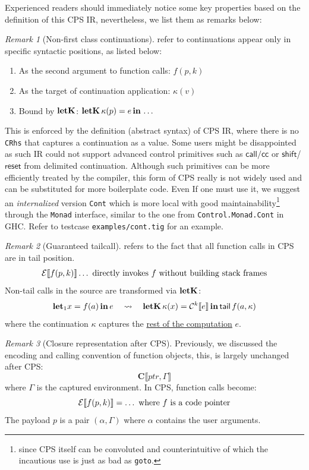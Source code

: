\documentclass[a4paper, 11pt]{article}
\theoremstyle{remark}\newtheorem*{remark}{Remark}
\theoremstyle{definition}\newtheorem*{definition}{Definition}
\begin{document}
Experienced readers should immediately notice some key properties based on the definition of
this CPS IR, nevertheless, we list them as remarks below:

\begin{remark}[Non-first class continuations] refer
to continuations appear only in specific syntactic positions, as listed below:
\begin{enumerate}
  \item As the second argument to function calls:  $f(p, k)$
  \item As the target of continuation application: $\kappa(v)$
  \item Bound by $\mathbf{letK}$: $\mathbf{letK}\, \kappa(p) = e\, \mathbf{in}\, \ldots$
\end{enumerate}
This is enforced by the definition (abstract syntax) of CPS IR, where there is
no \texttt{CRhs} that captures a continuation as a value. Some users might be disappointed
as such IR could not support advanced control primitives such as $\mathsf{call/cc}$ or
$\mathsf{shift}$/$\mathsf{reset}$ from delimited continuation. Although such primitives can be more
efficiently treated by the compiler, this form of CPS really is not widely used and can be substituted
for more boilerplate code. Even If one must use it,
we suggest an \emph{internalized} version \texttt{Cont} which is more local with
good maintainability\footnote{since CPS itself can be convoluted and counterintuitive of which
the incautious use is just as bad as \texttt{goto}.}
through the \texttt{Monad} interface, similar to the one from \texttt{Control.Monad.Cont} in GHC.
Refer to testcase \texttt{examples/cont.tig} for an example.
\end{remark}

\begin{remark}[Guaranteed tailcall] refers to the fact that all function calls in CPS are in tail position.
\[
  \mathcal{E}\llbracket f(p, k) \rrbracket\ldots\ \text{directly invokes}\ f\ \text{without building stack frames}
\]
Non-tail calls in the source are transformed via $\mathbf{letK}$:
\[
  \mathbf{let}_1 x = f(a)\, \mathbf{in}\, e
  \quad\leadsto\quad
  \mathbf{letK}\, \kappa(x) = \mathcal{C}^k\llbracket e \rrbracket\, \mathbf{in}\, \mathsf{tail}\, f(a, \kappa)
\]
where the continuation $\kappa$ captures the \underline{rest of the computation} $e$.
\end{remark}

\begin{remark}[Closure representation after CPS]
Previously, we discussed the encoding and calling convention of function objects, this, is
largely unchanged after CPS:
\[
  \mathbf{C}\llbracket \mathit{ptr}, \Gamma \rrbracket
\]
where $\Gamma$ is the captured environment.  In CPS, function calls become:
\[
  \mathcal{E}\sem{f(p, k)} = \ldots\ \text{where}\ f\ \text{is a code pointer}
\]
The payload $p$ is a pair $(\alpha, \Gamma)$ where $\alpha$ contains the user arguments.
\end{remark}
\end{document}
